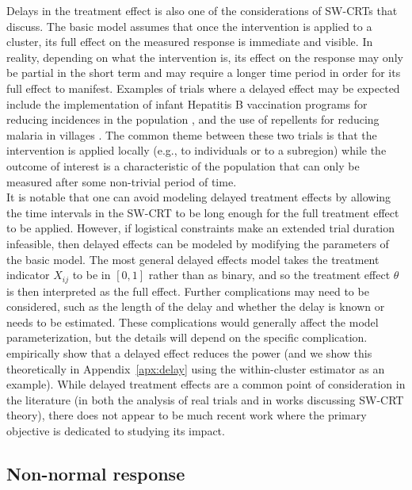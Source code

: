 \documentclass[10pt]{article}
\begin{document}
Delays in the treatment effect is also one of the considerations of SW-CRTs that \citeauthor{Hussey:2007} discuss. The basic model assumes that once the intervention is applied to a cluster, its full effect on the measured response is immediate and visible. In reality, depending on what the intervention is, its effect on the response may only be partial in the short term and may require a longer time period in order for its full effect to manifest. Examples of trials where a delayed effect may be expected include the implementation of infant Hepatitis B vaccination programs for reducing incidences in the population \parencite{Hughes:2015}, and the use of repellents for reducing malaria in villages \parencite{Agius:2020}. The common theme between these two trials is that the intervention is applied locally (e.g., to individuals or to a subregion) while the outcome of interest is a characteristic of the population that can only be measured after some non-trivial period of time.
\\

It is notable that one can avoid modeling delayed treatment effects by allowing the time intervals in the SW-CRT to be long enough for the full treatment effect to be applied. However, if logistical constraints make an extended trial duration infeasible, then delayed effects can be modeled by modifying the parameters of the basic model. The most general delayed effects model takes the treatment indicator $X_{ij}$ to be in $[0,1]$ rather than as binary, and so the treatment effect $\theta$ is then interpreted as the full effect. Further complications may need to be considered, such as the length of the delay and whether the delay is known or needs to be estimated. These complications would generally affect the model parameterization, but the details will depend on the specific complication.
\\

\textcite{Hussey:2007} empirically show that a delayed effect reduces the power (and we show this theoretically in Appendix~\ref{apx:delay} using the within-cluster estimator as an example). While delayed treatment effects are a common point of consideration in the literature (in both the analysis of real trials and in works discussing SW-CRT theory), there does not appear to be much recent work where the primary objective is dedicated to studying its impact.

\subsection{Non-normal response}
\end{document}
